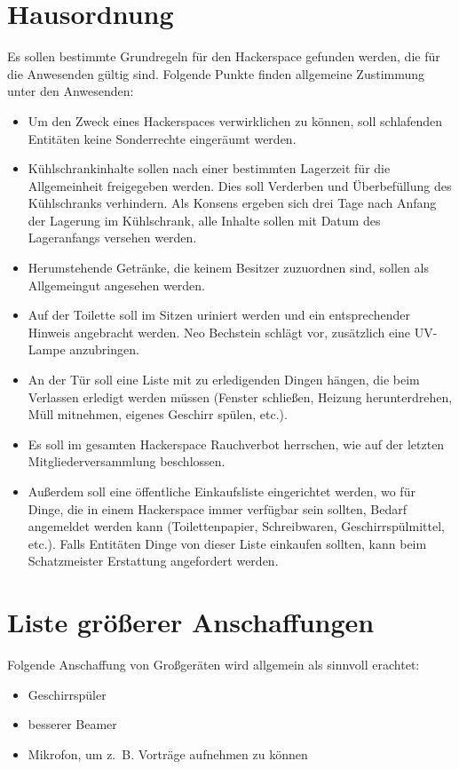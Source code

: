 \documentclass[a4paper,12pt]{scrartcl}
\begin{document}
\section{Hausordnung}
Es sollen bestimmte Grundregeln für den Hackerspace gefunden werden, die für die
Anwesenden gültig sind. Folgende Punkte finden allgemeine Zustimmung unter den
Anwesenden:
\begin{itemize}
  \item Um den Zweck eines Hackerspaces verwirklichen zu können, soll
		schlafenden Entitäten keine Sonderrechte eingeräumt werden.
	\item Kühlschrankinhalte sollen nach einer bestimmten Lagerzeit für die
		Allgemeinheit freigegeben werden. Dies soll Verderben und Überbefüllung des
		Kühlschranks verhindern. Als Konsens ergeben sich drei Tage nach Anfang der
		Lagerung im Kühlschrank, alle Inhalte sollen mit Datum des Lageranfangs
		versehen werden.
	\item Herumstehende Getränke, die keinem Besitzer zuzuordnen sind, sollen als
		Allgemeingut angesehen werden.
	\item Auf der Toilette soll im Sitzen uriniert werden und ein entsprechender
		Hinweis angebracht werden. Neo Bechstein schlägt vor, zusätzlich eine
		UV-Lampe anzubringen.
	\item An der Tür soll eine Liste mit zu erledigenden Dingen hängen, die beim
		Verlassen erledigt werden müssen (Fenster schließen, Heizung herunterdrehen,
		Müll mitnehmen, eigenes Geschirr spülen, etc.).
	\item Es soll im gesamten Hackerspace Rauchverbot herrschen, wie auf der
		letzten Mitgliederversammlung beschlossen.
	\item Außerdem soll eine öffentliche Einkaufsliste eingerichtet werden, wo
		für Dinge, die in einem Hackerspace immer verfügbar sein sollten, Bedarf
		angemeldet werden kann (Toilettenpapier, Schreibwaren, Geschirrspülmittel,
		etc.). Falls Entitäten Dinge von dieser Liste einkaufen sollten, kann beim
		Schatzmeister Erstattung angefordert werden.
\end{itemize}

\section{Liste größerer Anschaffungen}
Folgende Anschaffung von Großgeräten wird allgemein als sinnvoll erachtet:
\begin{itemize}
	\item Geschirrspüler
	\item besserer Beamer
	\item Mikrofon, um z.~B. Vorträge aufnehmen zu können
\end{itemize}
\end{document}
